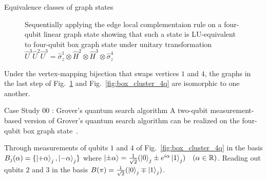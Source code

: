 \documentclass[final]{beamer}
\newlength{\colwidth}
\begin{document}
\begin{frame}[t]
\begin{columns}[t]
\begin{column}{\colwidth}
\begin{block}{Equivalence classes of graph states}
\begin{figure}[H]
\begin{subfigure}[b]{0.25\textwidth}
                        \end{subfigure}
                        \caption{Sequentially applying the edge local complementaion
                            rule on a four-qubit linear graph state showing that such a
                            state is LU-equivalent to four-qubit box graph state under
                            unitary transformation $\hat{U}^{3}\hat{U}^{2}\hat{U}^{3} =
                            \hat{\sigma}^{1}_{z}\otimes\hat{H}^{2}\otimes\hat{H}^{3}\otimes\hat{\sigma}^{4}_z$}
                            \label{fig:edge_local_complementation_example}
                    \end{figure}

                    Under the vertex-mapping bijection that swaps vertices $1$ and $4$, the
                    graphs in the last step of
                    Fig.~\ref{fig:edge_local_complementation_example} and
                    Fig.~\ref{fig:box_cluster_4q} are isomorphic to one another.
                \end{block}
                \begin{block}{Case Study 00 : Grover's quantum search algorithm}
                    A two-qubit measurement-based version of Grover's quantum search algorithm can be realized
                    on the four-qubit box graph state~\cite{Walther_2005}.

                    Through measurements of qubits $1$ and $4$ of Fig.~\ref{fig:box_cluster_4q} in the
                    basis $B_j(\alpha) = \{\ket{+\alpha}_j, \ket{-\alpha}_j\}$
                    where $\ket{\pm \alpha} = \frac{1}{\sqrt{2}}(\ket{0}_j \pm
                    e^{i\alpha}\ket{1}_j) \quad (\alpha \in \mathbb{R})$. Reading out
                    qubits $2$ and $3$ in the basis $B(\pi) =
                    \frac{1}{\sqrt{2}}(\ket{0}_j \mp \ket{1}_j)$.



\end{block}
\end{column}
\end{columns}
\end{frame}
\end{document}
